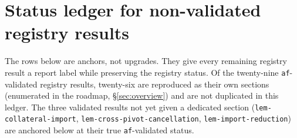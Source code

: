 \section{Status ledger for non-validated registry results}\label{sec:status-ledger}

The rows below are anchors, not upgrades.  They give every remaining
registry result a report label while preserving the registry status.
Of the twenty-nine \texttt{af}-validated registry results, twenty-six
are reproduced as their own sections (enumerated in the roadmap,
\S\ref{sec:overview}) and are not duplicated in this ledger.  The three
validated results not yet given a dedicated section
(\texttt{lem-collateral-import}, \texttt{lem-cross-pivot-cancellation},
\texttt{lem-import-reduction}) are anchored below at their true
\texttt{af}-validated status.


